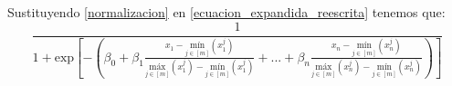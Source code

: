 \documentclass{article}
\begin{document}
Sustituyendo \ref{normalizacion} en \ref{ecuacion_expandida_reescrita} tenemos que: 
\begin{equation} \label{ecuacion_chorrizo}
    \frac{1}{1+\mbox{exp}\left [ -\left ( \beta _{0} + \beta _{1}\frac{x_{1}- \underset{j\in [m]}{\mbox{mín}}\left (x_{1}^{j}\right )}{\underset{j\in [m ]}{\mbox{máx}}\left (x_{1}^{j}\right )-\underset{j\in [m]}{\mbox{mín}}\left (  x_{1}^{j}\right )}+...+\beta_{n}\frac{x_{n} - \underset{j\in [m]}{\mbox{mín}}\left (  x_{n}^{j}\right )}{\underset{j\in [m]}{\mbox{máx}}\left (  x_{n}^{j}\right )-\underset{j\in [m]}{\mbox{mín}}\left (  x_{n}^{j}\right )}\right ) \right ]}
\end{equation}
\end{document}
